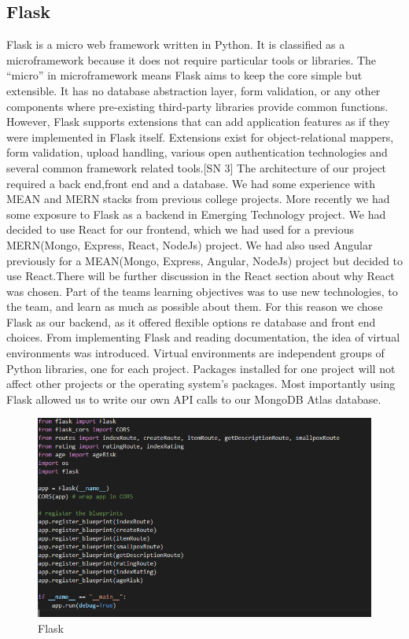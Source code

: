 \subsection{Flask}
Flask is a micro web framework written in Python. It is classified as a microframework because it does not require particular tools or libraries. The “micro” in microframework means Flask aims to keep the core simple but extensible. It has no database abstraction layer, form validation, or any other components where pre-existing third-party libraries provide common functions. However, Flask supports extensions that can add application features as if they were implemented in Flask itself. Extensions exist for object-relational mappers, form validation, upload handling, various open authentication technologies and several common framework related tools.[SN 3]
The architecture of our project required a back end,front end and a database. We had some experience with MEAN and MERN stacks from previous college projects. More recently we had some exposure to Flask as a backend in Emerging Technology project. We had decided to use React for our frontend, which we had used for a previous MERN(Mongo, Express, React, NodeJs) project. We had also used Angular previously for a MEAN(Mongo, Express, Angular, NodeJs) project but decided to use React.There will be further discussion in the React section about why React was chosen. Part of the teams learning objectives was to use new technologies, to the team, and learn as much as possible about them. For this reason we chose Flask as our backend, as it offered flexible options re database and front end choices. From implementing Flask and reading documentation, the idea of virtual environments was introduced. Virtual environments are independent groups of Python libraries, one for each project. Packages installed for one project will not affect other projects or the operating system’s packages.\cite{virtualenv}
Most importantly using Flask allowed us to write our own API calls to our MongoDB Atlas database.

\begin{figure}
    \centering
    \includegraphics[scale=0.5]{img/flask.PNG}
    \caption{Flask}
    \label{fig:my_label2}
\end{figure}















